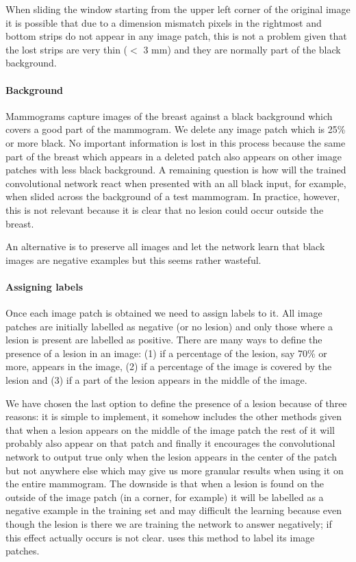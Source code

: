 When sliding the window starting from the upper left corner of the original image it is possible that due to a dimension mismatch pixels in the rightmost and bottom strips do not appear in any image patch, this is not a problem given that the lost strips are very thin ($<$ 3 mm) and they are normally part of the black background.

\paragraph{Background}
Mammograms capture images of the breast against a black background which covers a good part of the mammogram. We delete any image patch which is 25\% or more black. No important information is lost in this process because the same part of the breast which appears in a deleted patch also appears on other image patches with less black background. A remaining question is how will the trained convolutional network react when presented with an all black input, for example, when slided across the background of a test mammogram. In practice, however, this is not relevant because it is clear that no lesion could occur outside the breast. 

An alternative is to preserve all images and let the network learn that black images are negative examples but this seems rather wasteful.

\paragraph{Assigning labels}
Once each image patch is obtained we need to assign labels to it. All image patches are initially labelled as negative (or no lesion) and only those where a lesion is present are labelled as positive. There are many ways to define the presence of a lesion in an image: (1) if a percentage of the lesion, say 70\% or more, appears in the image, (2) if a percentage of the image is covered by the lesion and (3) if a part of the lesion appears in the middle of the image.

We have chosen the last option to define the presence of a lesion because of three reasons: it is simple to implement, it somehow includes the other methods given that when a lesion appears on the middle of the image patch the rest of it will probably also appear on that patch and finally it encourages the convolutional network to output true only when the lesion appears in the center of the patch but not anywhere else which may give us more granular results when using it on the entire mammogram. The downside is that when a lesion is found on the outside of the image patch (in a corner, for example) it will be labelled as a negative example in the training set and may difficult the learning because even though the lesion is there we are training the network to answer negatively; if this effect actually occurs is not clear. \cite{Ciresan2013} uses this method to label its image patches.

